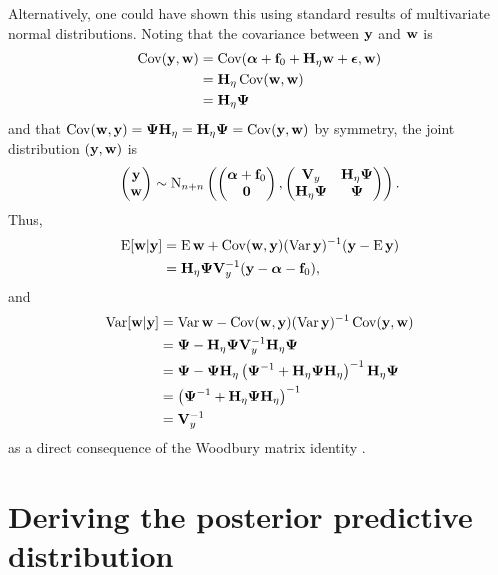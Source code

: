 Alternatively, one could have shown this using standard results of multivariate normal distributions.
Noting that the covariance between $\by$ and $\bw$ is  %
\begin{align*}
  \Cov(\by,\bw) 
  &= \Cov(\balpha + \bff_0 + \bH_\eta\bw + \bepsilon, \bw) \\
  &= \bH_\eta\Cov(\bw,\bw) \\
  &= \bH_\eta\bPsi 
\end{align*}
and that $\Cov(\bw,\by) = \bPsi\bH_\eta = \bH_\eta\bPsi = \Cov(\by,\bw)$ by symmetry, the joint distribution $(\by,\bw)$ is
\[
  \begin{pmatrix}
    \by \\
    \bw
  \end{pmatrix}
  \sim \N_{n+n}
  \left(
    \begin{pmatrix}
      \balpha + \bff_0 \\
      \bzero
    \end{pmatrix},
    \begin{pmatrix}
      \bV_y         & \bH_\eta\bPsi \\
      \bH_\eta\bPsi & \bPsi \\
    \end{pmatrix}
  \right).
\] 
Thus,
\begin{align*}
  \E [\bw|\by] 
  &= \E \bw + \Cov(\bw,\by) (\Var \by)^{-1} (\by - \E \by) \\
  &= \bH_\eta\bPsi\bV_y^{-1}(\by - \balpha - \bff_0),
\end{align*}
and
\begin{align*}
  \Var [\bw|\by] 
  &= \Var \bw - \Cov(\bw,\by) (\Var \by)^{-1} \Cov(\by,\bw) \\
  &= \bPsi - \bH_\eta\bPsi\bV_y^{-1}\bH_\eta\bPsi \\
  &= \bPsi - \bPsi\bH_\eta \left(\bPsi^{-1} + \bH_\eta\bPsi\bH_\eta \right)^{-1}\bH_\eta\bPsi  \\
  &= \left(\bPsi^{-1} + \bH_\eta\bPsi\bH_\eta \right)^{-1} \\
  &= \bV_y^{-1}
\end{align*}
as a direct consequence of the Woodbury matrix identity \citep[eq. (156), §3.2.2]{petersen2008matrix}.

\section{Deriving the posterior predictive distribution}
\label{apx:postpred}

